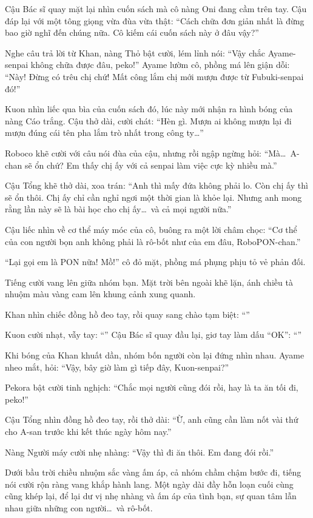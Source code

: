 \documentclass[../main.tex]{subfiles}
\begin{document}
Cậu Bác sĩ quay mặt lại nhìn cuốn sách mà cô nàng Oni đang cầm trên tay. Cậu đáp lại với một tông giọng vừa đùa vừa thật: ``Cách chữa đơn giản nhất là đừng bao giờ nghĩ đến chúng nữa. Cô kiếm cái cuốn sách này ở đâu vậy?''

Nghe câu trả lời từ Khan, nàng Thỏ bật cười, lém lỉnh nói: ``Vậy chắc Ayame-senpai không chữa được đâu, peko!'' Ayame lườm cô, phồng má lên giận dỗi: ``Này! Đừng có trêu chị chứ! Mất công lắm chị mới mượn được từ Fubuki-senpai đó!''

Kuon nhìn liếc qua bìa của cuốn sách đó, lúc này mới nhận ra hình bóng của nàng Cáo trắng. Cậu thở dài, cười chát: ``Hèn gì. Mượn ai không mượn lại đi mượn đúng cái tên pha lắm trò nhất trong công ty\dots''

Roboco khẽ cười với câu nói đùa của cậu, nhưng rồi ngập ngừng hỏi: ``Mà\dots\ A-chan sẽ ổn chứ? Em thấy chị ấy với cả senpai làm việc cực kỳ nhiều mà.''

Cậu Tổng khẽ thở dài, xoa trán: ``Anh thì mấy đứa không phải lo. Còn chị ấy thì sẽ ổn thôi. Chị ấy chỉ cần nghỉ ngơi một thời gian là khỏe lại. Nhưng anh mong rằng lần này sẽ là bài học cho chị ấy\dots\ và cả mọi người nữa.''

Cậu liếc nhìn về cơ thể máy móc của cô, buông ra một lời châm chọc: ``Cơ thể của con người bọn anh không phải là rô-bốt như của em đâu, RoboPON-chan.''

``Lại gọi em là PON nữa! Mồ!'' cô đỏ mặt, phồng má phụng phịu tỏ vẻ phản đối.

Tiếng cười vang lên giữa nhóm bạn. Mặt trời bên ngoài khẽ lặn, ánh chiều tà nhuộm màu vàng cam lên khung cảnh xung quanh.

Khan nhìn chiếc đồng hồ đeo tay, rồi quay sang chào tạm biệt: ``''

Kuon cười nhạt, vẫy tay: ``'' Cậu Bác sĩ quay đầu lại, giơ tay làm dấu ``OK'': ``''

Khi bóng của Khan khuất dần, nhóm bốn người còn lại đứng nhìn nhau. Ayame nheo mắt, hỏi: ``Vậy, bây giờ làm gì tiếp đây, Kuon-senpai?''

Pekora bật cười tinh nghịch: ``Chắc mọi người cũng đói rồi, hay là ta ăn tối đi, peko!''

Cậu Tổng nhìn đồng hồ đeo tay, rồi thở dài: ``Ừ, anh cũng cần làm nốt vài thứ cho A-san trước khi kết thúc ngày hôm nay.''

Nàng Người máy cười nhẹ nhàng: ``Vậy thì đi ăn thôi. Em đang đói rồi.''

Dưới bầu trời chiều nhuộm sắc vàng ấm áp, cả nhóm chầm chậm bước đi, tiếng nói cười rộn ràng vang khắp hành lang. Một ngày dài đầy hỗn loạn cuối cùng cũng khép lại, để lại dư vị nhẹ nhàng và ấm áp của tình bạn, sự quan tâm lẫn nhau giữa những con người\dots\ và rô-bốt.
\end{document}
